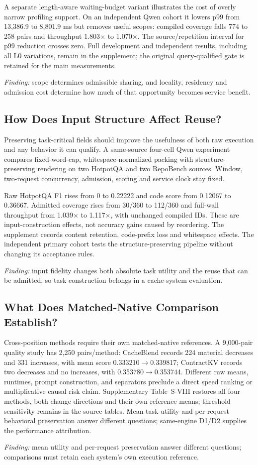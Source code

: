 \label{sec:costvariant}
A separate length-aware waiting-budget variant illustrates the cost of overly narrow profiling support. On an independent Qwen cohort it lowers p99 from 13,386.9 to 8,801.9 ms but removes useful scopes: compiled coverage falls 774 to 258 pairs and throughput 1.803$\times$ to 1.070$\times$. The source/repetition interval for p99 reduction crosses zero. Full development and independent results, including all L0 variations, remain in the supplement; the original query-qualified gate is retained for the main measurements.

\noindent\emph{Finding:} scope determines admissible sharing, and locality, residency and admission cost determine how much of that opportunity becomes service benefit.

\subsection{How Does Input Structure Affect Reuse?}
\label{sec:fidelity}
Preserving task-critical fields should improve the usefulness of both raw execution and any behavior it can qualify. A same-source four-cell Qwen experiment compares fixed-word-cap, whitespace-normalized packing with structure-preserving rendering on two HotpotQA and two RepoBench sources. Window, two-request concurrency, admission, scoring and service clock stay fixed.

Raw HotpotQA F1 rises from 0 to 0.22222 and code score from 0.12067 to 0.36667. Admitted coverage rises from 30/360 to 112/360 and full-wall throughput from 1.039$\times$ to 1.117$\times$, with unchanged compiled IDs. These are input-construction effects, not accuracy gains caused by reordering. The supplement records content retention, code-prefix loss and whitespace effects. The independent primary cohort tests the structure-preserving pipeline without changing its acceptance rules.

\noindent\emph{Finding:} input fidelity changes both absolute task utility and the reuse that can be admitted, so task construction belongs in a cache-system evaluation.

\subsection{What Does Matched-Native Comparison Establish?}
\label{sec:baselines}
Cross-position methods require their own matched-native references. A 9,000-pair quality study has 2,250 pairs/method: CacheBlend records 224 material decreases and 331 increases, with mean score 0.333210$\rightarrow$0.339817; ContractKV records two decreases and no increases, with 0.353780$\rightarrow$0.353744. Different raw means, runtimes, prompt construction, and separators preclude a direct speed ranking or multiplicative causal risk claim. Supplementary Table~S-VIII restores all four methods, both change directions and their own reference means; threshold sensitivity remains in the source tables. Mean task utility and per-request behavioral preservation answer different questions; same-engine D1/D2 supplies the performance attribution.

\noindent\emph{Finding:} mean utility and per-request preservation answer different questions; comparisons must retain each system's own execution reference.
